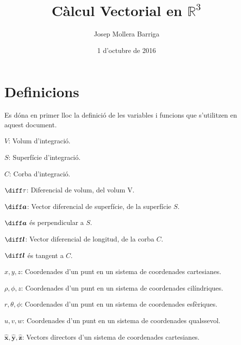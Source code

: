 \documentclass[catalan,a4paper,twoside,11pt]{article}
\begin{document}
\title{Càlcul Vectorial en $\mathbb{R}^3$}
\author{Josep Mollera Barriga}
\date{1 d'octubre de 2016}
\maketitle



\section{Definicions}

Es dóna  en primer lloc la definició de les variables i funcions que s'utilitzen en aquest document.

\begin{list}{}
{\setlength{\labelwidth}{16mm}
\setlength{\leftmargin}{18mm}\setlength{\labelsep}{2mm}}
   \item[$V$:] Volum d'integració.

   \item[$S$:] Superfície d'integració.

   \item[$C$:] Corba d'integració.

   \item[$\diff\tau$:] Diferencial de volum, del volum V.

   \item[$\boldsymbol{\diff a}$:] Vector diferencial de superfície, de la superfície $S$.

   $\boldsymbol{\diff a}$ és perpendicular a $S$.

   \item[$\boldsymbol{\diff l}$:] Vector diferencial de longitud, de la corba
   $C$.

   $\boldsymbol{\diff l}$ és tangent a $C$.

   \item[$x,y,z$:] Coordenades d'un punt en un sistema de coordenades cartesianes.

   \item[$\rho,\phi,z$:] Coordenades d'un punt en un sistema de   coordenades cilíndriques.

   \item[$r,\theta,\phi$:] Coordenades d'un punt en un sistema de   coordenades esfèriques.

   \item[$u,v,w$:] Coordenades d'un punt en un sistema de   coordenades qualssevol.
   \item[$\boldsymbol{\hat{x}},\boldsymbol{\hat{y}},\boldsymbol{\hat{z}}$:]
   Vectors directors d'un sistema de  coordenades    cartesianes.


\end{list}
\end{document}

